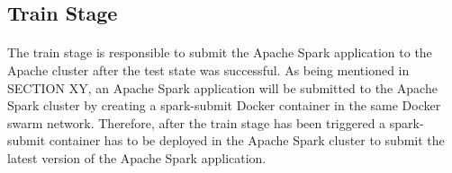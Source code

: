 \subsection{Train Stage}
\paragraph{}
The train stage is responsible to submit the Apache Spark application to the Apache cluster after the test state was successful.
As being mentioned in SECTION XY, an Apache Spark application will be submitted to the Apache Spark cluster by creating a spark-submit Docker container in the same Docker swarm network.
Therefore, after the train stage has been triggered a spark-submit container has to be deployed in the Apache Spark cluster to submit the latest version of the Apache Spark application.

